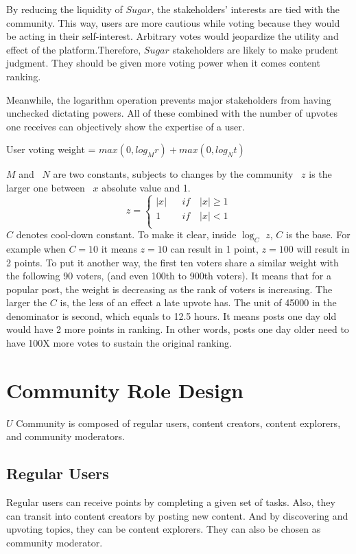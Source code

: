By reducing the liquidity of $Sugar$, the stakeholders' interests are tied with the community. This way, users are more cautious while voting because they would be acting in their self-interest. Arbitrary votes would jeopardize the utility and effect of the platform.Therefore, $Sugar$ stakeholders are likely to make prudent judgment. They should be given more voting power when it comes content ranking. \par
Meanwhile, the logarithm operation prevents major stakeholders from having unchecked dictating powers.
All of these combined with the number of upvotes one receives can objectively show the expertise of a user. 
\begin{center}
        User voting weight = $max(0, log_M r) + max (0, log_N t)$
\end{center}
$M$ and \ $N$ are two constants, subjects to changes by the community
\ $z$ is the larger one between \ $x$ absolute value and 1.
$$z =\left\{
\begin{array}{rcl}
|x|       &      & {if \quad |x| \geq 1}\\
1     &      & {if \quad |x| < 1}\\
\end{array} \right. $$
$C$ denotes cool-down constant. To make it clear, inside $\log_{C}$ $z$, $C$ is the base. For example when $C = 10$ it means $z = 10$ can result in 1 point, $z = 100$ will result in 2 points. To put it another way, the first ten voters share a similar weight with the following 90 voters, (and even 100th to 900th voters). It means that for a popular post, the weight is decreasing as the rank of voters is increasing. The larger the $C$ is, the less of an effect a late upvote has.
The unit of 45000 in the denominator is second, which equals to 12.5 hours. It means posts one day old would have 2 more points in ranking. In other words, posts one day older need to have 100X more votes to sustain the original ranking.  
\section{Community Role Design}
$U$ Community is composed of regular users, content creators, content explorers, and community moderators. 
\subsection{Regular Users}
Regular users can receive points by completing a given set of tasks. Also, they can transit into content creators by posting new content. And by discovering and upvoting topics, they can be content explorers. They can also be chosen as community moderator.  
